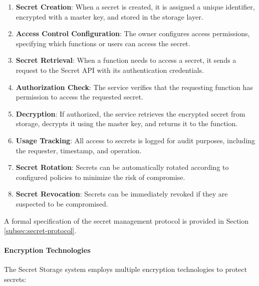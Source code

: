 \documentclass{article}
\begin{document}
\begin{enumerate}
    \item \textbf{Secret Creation}: When a secret is created, it is assigned a unique identifier, encrypted with a master key, and stored in the storage layer.
    
    \item \textbf{Access Control Configuration}: The owner configures access permissions, specifying which functions or users can access the secret.
    
    \item \textbf{Secret Retrieval}: When a function needs to access a secret, it sends a request to the Secret API with its authentication credentials.
    
    \item \textbf{Authorization Check}: The service verifies that the requesting function has permission to access the requested secret.
    
    \item \textbf{Decryption}: If authorized, the service retrieves the encrypted secret from storage, decrypts it using the master key, and returns it to the function.
    
    \item \textbf{Usage Tracking}: All access to secrets is logged for audit purposes, including the requester, timestamp, and operation.
    
    \item \textbf{Secret Rotation}: Secrets can be automatically rotated according to configured policies to minimize the risk of compromise.
    
    \item \textbf{Secret Revocation}: Secrets can be immediately revoked if they are suspected to be compromised.
\end{enumerate}

A formal specification of the secret management protocol is provided in Section \ref{subsec:secret-protocol}.



\paragraph{Encryption Technologies}
The Secret Storage system employs multiple encryption technologies to protect secrets:
\end{document}
